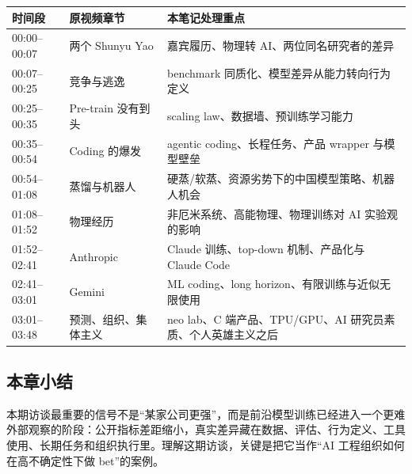 \noindent\begin{longtable}{p{}p{}p{}}
\toprule
时间段 & 原视频章节 & 本笔记处理重点 \\
\midrule
00:00--00:07 & 两个 Shunyu Yao & 嘉宾履历、物理转 AI、两位同名研究者的差异 \\
00:07--00:25 & 竞争与逃逸 & benchmark 同质化、模型差异从能力转向行为定义 \\
00:25--00:35 & Pre-train 没有到头 & scaling law、数据墙、预训练学习能力 \\
00:35--00:54 & Coding 的爆发 & agentic coding、长程任务、产品 wrapper 与模型壁垒 \\
00:54--01:08 & 蒸馏与机器人 & 硬蒸/软蒸、资源劣势下的中国模型策略、机器人机会 \\
01:08--01:52 & 物理经历 & 非厄米系统、高能物理、物理训练对 AI 实验观的影响 \\
01:52--02:41 & Anthropic & Claude 训练、top-down 机制、产品化与 Claude Code \\
02:41--03:01 & Gemini & ML coding、long horizon、有限训练与近似无限使用 \\
03:01--03:48 & 预测、组织、集体主义 & neo lab、C 端产品、TPU/GPU、AI 研究员素质、个人英雄主义之后 \\
\bottomrule
\end{longtable}

\subsection{本章小结}

本期访谈最重要的信号不是“某家公司更强”，而是前沿模型训练已经进入一个更难外部观察的阶段：公开指标差距缩小，真实差异藏在数据、评估、行为定义、工具使用、长期任务和组织执行里。理解这期访谈，关键是把它当作“AI 工程组织如何在高不确定性下做 bet”的案例。


